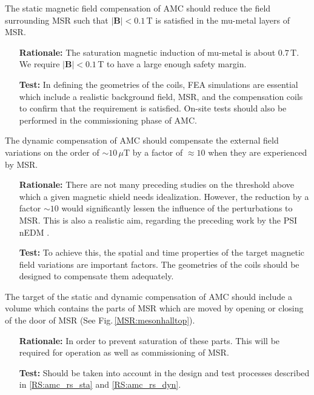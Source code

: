 \begin{RSenumerate}[resume]
\item  The static magnetic field compensation of AMC should reduce the field surrounding MSR such that $|\mathbf{B}|<0.1\,$T is satisfied in the mu-metal layers of MSR. \label{RS:amc_rs_sta}
\begin{itemize}
  \item[\textbf{Rationale:}] The saturation magnetic induction of mu-metal is about $ 0.7\,$T. We require $|\mathbf{B}|<0.1\,$T to have a large enough safety margin.
  \item[\textbf{Test:}] In defining the geometries of the coils, FEA simulations are essential which include a realistic background field, MSR, and the compensation coils to confirm that the requirement is satisfied. On-site tests should also be performed in the commissioning phase of AMC.
\end{itemize}

 \item The dynamic compensation of AMC should compensate the external field variations on the order of $\sim 10\,\mu$T by a factor of $\approx 10$ when they are experienced by MSR. \label{RS:amc_rs_dyn}
 \begin{itemize}
  \item[\textbf{Rationale:}] 
  There are not many preceding studies on the threshold above which a given magnetic shield needs idealization. However, the reduction by a factor $\sim 10$ would significantly lessen the influence of the perturbations to MSR. This is also a realistic aim, regarding the preceding work by the PSI nEDM \cite{Afach 2014}. 
  \item[\textbf{Test:}] 
  To achieve this, the spatial and time properties of the target magnetic field variations are important factors. The geometries of the coils should be designed to compensate them adequately.
\end{itemize}

 \item The target of the static and dynamic compensation of AMC should include a volume which contains the parts of MSR which are moved by opening or closing of the door of MSR \label{RS:amc_rs_volume} (See Fig.\,\ref{MSR:mesonhalltop}).
 \begin{itemize}
  \item[\textbf{Rationale:}] In order to prevent saturation of these parts. This will be required for operation as well as commissioning of MSR. 
  \item[\textbf{Test:}] Should be taken into account in the design and test processes described in \ref{RS:amc_rs_sta} and \ref{RS:amc_rs_dyn}.
\end{itemize}
\end{RSenumerate}


